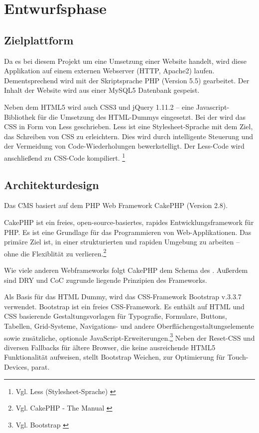 \section{Entwurfsphase} 
\label{sec:Entwurfsphase}

\subsection{Zielplattform}
\label{sec:Zielplattform}
Da es bei diesem Projekt um eine Umsetzung einer Website handelt, wird diese
Applikation auf einem externen Webserver (\ac{HTTP}, Apache2) laufen.
Dementsprechend wird mit der Skriptsprache \ac{PHP} (Version 5.5) gearbeitet. Der Inhalt der Website wird aus
einer MySQL5 Datenbank gespeist.

Neben dem HTML5 wird auch
\ac{CSS}3 und jQuery 1.11.2 -- eine Javascript-Bibliothek für die Umsetzung des
HTML-Dummys eingesetzt. Bei der \mh wird das \ac{CSS} in Form von Less
geschrieben. Less ist eine Stylesheet-Sprache mit dem Ziel, das Schreiben von
CSS zu erleichtern. Dies wird durch intelligente Steuerung und der Vermeidung von 
Code-Wiederholungen bewerkstelligt. Der Less-Code wird anschließend
zu CSS-Code kompiliert.  \footnote{Vgl. Less (Stylesheet-Sprache)
\cite{wiki:Less_(Stylesheet-Sprache)}}

\subsection{Architekturdesign}
\label{sec:Architekturdesign}
Das \ac{CMS} \ct basiert auf dem \ac{PHP} Web Framework CakePHP (Version 2.8).

CakePHP ist ein freies, open-source-basiertes, rapides Entwicklungsframework für
PHP.
Es ist eine Grundlage für das Programmieren von Web-Applikationen.
Das primäre Ziel ist, in einer strukturierten und rapiden Umgebung zu arbeiten
 -- ohne die Flexiblität zu verlieren.\footnote{Vgl. CakePHP - The Manual
 \cite{CakePHP}}

Wie viele anderen Webframeworks folgt CakePHP dem Schema des
. Außerdem sind \ac{DRY}
und \ac{CoC} zugrunde liegende Prinzipien des Frameworks.

Als Basis für das HTML Dummy, wird das CSS-Framework
Bootstrap v.3.3.7 verwendet.
Bootstrap ist ein freies CSS-Framework. Es enthält auf HTML und CSS basierende
Gestaltungsvorlagen für Typografie, Formulare, Buttons, Tabellen, Grid-Systeme, 
Navigations- und andere Oberflächengestaltungselemente sowie zusätzliche, 
optionale JavaScript-Erweiterungen.\footnote{Vgl. Bootstrap
\cite{wiki:Bootstrap_(Framework)}} Neben der Reset-CSS und diversen Fallbacks
für ältere Browser, die keine ausreichende HTML5 Funktionalität aufweisen, stellt Bootstrap Weichen,
\zB zur Optimierung für Touch-Devices, parat. 

